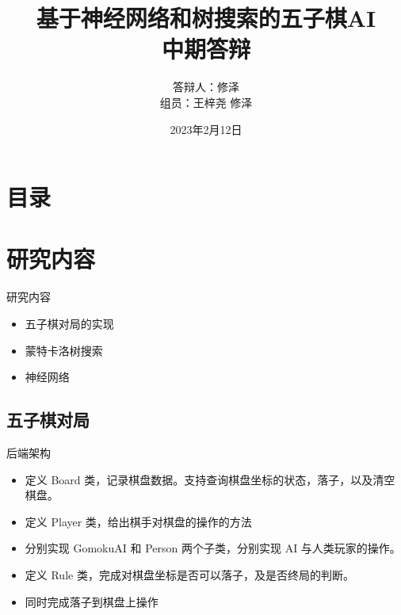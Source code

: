 \documentclass[compress]{beamer}
\begin{document}
\graphicspath{{figures/}}

\title[基于神经网络和树搜索的五子棋AI]{基于神经网络和树搜索的五子棋AI\\[2mm] 中期答辩}
\author[王梓尧]{答辩人：修泽\\[2mm] 组员：王梓尧 \hspace{2pt} 修泽}
\date{\small \vskip -10pt 2023年2月12日}

\begin{frame}
  \maketitle
\end{frame}

\section*{目录}
\frame{
  \frametitle{\secname}
  \tableofcontents[hideallsubsections]
}

\section{研究内容}

\begin{frame}{研究内容}
  \begin{itemize}
	\item 五子棋对局的实现
    \item 蒙特卡洛树搜索
    \item 神经网络
  \end{itemize}
\end{frame}

\subsection{五子棋对局}
\begin{frame}{后端架构}
  \begin{itemize}
	\item 定义 Board 类，记录棋盘数据。支持查询棋盘坐标的状态，落子，以及清空棋盘。 
		\pause
	\\[5mm]
    \item 定义 Player 类，给出棋手对棋盘的操作的方法
    \item 分别实现 GomokuAI 和 Person 两个子类，分别实现 AI 与人类玩家的操作。
		\pause
	\\[5mm]
    \item 定义 Rule 类，完成对棋盘坐标是否可以落子，及是否终局的判断。
	\item 同时完成落子到棋盘上操作
  \end{itemize}
\end{frame}
\end{document}
